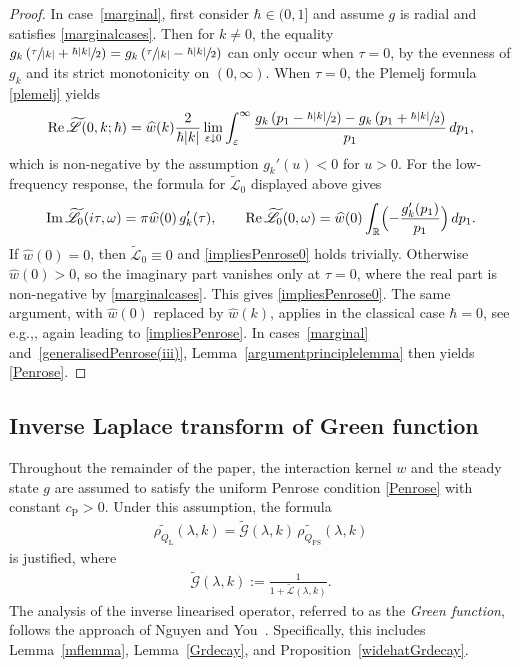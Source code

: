 \documentclass[11pt]{article}
\newcommand{\eg}{e.g.,\xspace}
\theoremstyle{plain}
\theoremstyle{remark}
\newcommand{\Bbr}[1]{\Bigl(#1 \Bigr)}
\newcommand{\R}{\mathbb{R}}
\begin{document}
\begin{proof}
In case~\eqref{marginal}, first consider $\hbar\in(0,1]$ and assume \( g \) is radial and satisfies \eqref{marginalcases}. Then for \( k \neq 0 \), the equality $g_k\left( \sfrac{\tau}{\abs{k}} + \sfrac{\hbar \abs{k}}{2} \right)
=
g_k\left( \sfrac{\tau}{\abs{k}} - \sfrac{\hbar \abs{k}}{2} \right)$
can only occur when \( \tau = 0 \), by the evenness of \( g_k \) and its strict monotonicity on $(0,\infty)$. When \( \tau = 0 \), the Plemelj formula \eqref{plemelj} yields
\[
\Re \widetilde{\mathscr L}(0,k;\hbar)
= \widehat w(k)\frac{2}{\hbar \abs{k}}
\lim_{\varepsilon \downarrow 0} \int_\varepsilon^\infty
\frac{
g_k\left(p_1 - \sfrac{\hbar \abs{k}}{2}\right)
- g_k\left(p_1 + \sfrac{\hbar \abs{k}}{2}\right)
}{p_1} \, dp_1,
\]
which is non-negative by the assumption \( g_k'(u) < 0 \) for \( u > 0 \). For the low-frequency response, the formula for \( \widetilde{\mathscr L}_0 \) displayed above gives
\[
\Im \widetilde{\mathscr L}_0(i\tau,\omega) = \pi\widehat w(0)\,g_k'(\tau),
\qquad
\Re \widetilde{\mathscr L}_0(0,\omega) = \widehat w(0)\int_{\R}\Bbr{-\frac{g_k'(p_1)}{p_1}}\,dp_1.
\]
If \( \widehat w(0)=0 \), then \( \widetilde{\mathscr L}_0\equiv0 \) and \eqref{impliesPenrose0} holds trivially. Otherwise \( \widehat w(0)>0 \), so the imaginary part vanishes only at \( \tau = 0 \), where the real part is non-negative by \eqref{marginalcases}. This gives \eqref{impliesPenrose0}. The same argument, with \( \widehat w(0) \) replaced by \( \widehat w(k) \), applies in the classical case \( \hbar = 0 \), see \eg \cite{bed-mas-mou-2016}, again leading to \eqref{impliesPenrose}. In cases~\eqref{marginal} and~\eqref{generalisedPenrose(iii)}, Lemma~\ref{argumentprinciplelemma} then yields \eqref{Penrose}.
\end{proof}

\subsection{Inverse Laplace transform of Green function}
Throughout the remainder of the paper, the interaction kernel \( w \) and the steady state \( g \) are assumed to satisfy the uniform Penrose condition \eqref{Penrose} with constant \( {c_{\mathrm{P}}} > 0 \). Under this assumption, the formula
\begin{align}
\widetilde{\rho_{Q_{\mathrm{L}}}}(\lambda,k) = \widetilde{\mathscr{G}}(\lambda,k)\,\widetilde{\rho_{Q_{\mathrm{FS}}}}(\lambda,k) \label{1/1+L}
\end{align}
is justified, where
\begin{align}
\widetilde{\mathscr{G}}(\lambda,k) := \frac{1}{1 + \widetilde{\mathscr{L}}(\lambda,k)}. \label{definitionofwidetildeG}
\end{align}
The analysis of the inverse linearised operator, referred to as the \textit{Green function}, follows the approach of Nguyen and You~\cite{NguyenYou2023}. Specifically, this includes Lemma~\ref{mflemma}, Lemma~\ref{Grdecay}, and Proposition~\ref{widehatGrdecay}.
\end{document}
